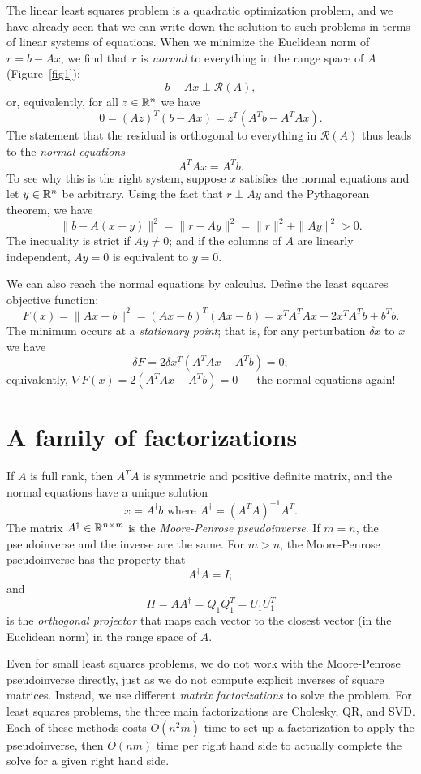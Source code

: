 \documentclass[12pt, leqno]{article} %
\begin{document}
The linear least squares problem is a quadratic optimization problem,
and we have already seen that we can write down the solution to such
problems in terms of linear systems of equations.
When we minimize the Euclidean norm of $r = b-Ax$, we find that $r$ is
{\em normal} to everything in the range space of $A$ (Figure~\ref{fig1}):
\[
  b-Ax \perp \mathcal{R}(A),
\]
or, equivalently, for all $z \in \mathbb{R}^n$ we have
\[
  0 = (Az)^T (b-Ax) = z^T(A^T b - A^T A x).
\]
The statement that the residual is orthogonal to everything in
$\mathcal{R}(A)$ thus leads to the {\em normal equations}
\[
  A^T A x = A^T b.
\]
To see why this is the right system, suppose $x$ satisfies the normal
equations and let $y \in \mathbb{R}^{n}$ be arbitrary.  Using the fact that
$r \perp Ay$ and the Pythagorean theorem, we have
\[
  \|b-A(x+y)\|^2 = \|r-Ay\|^2 = \|r\|^2 + \|Ay\|^2 > 0.
\]
The inequality is strict if $Ay \neq 0$; and if the columns of
$A$ are linearly independent, $Ay = 0$ is equivalent to $y = 0$.

We can also reach the normal equations by calculus.  Define
the least squares objective function:
\[
  F(x) = \|Ax-b\|^2 = (Ax-b)^T (Ax-b) = x^T A^TA x - 2x^T A^T b + b^T b.
\]
The minimum occurs at a {\em stationary point}; that is,
for any perturbation $\delta x$ to $x$ we have
\[
  \delta F = 2 \delta x^T (A^T A x - A^T b) = 0;
\]
equivalently, $\nabla F(x) = 2 (A^T A x - A^T b) = 0$ ---
the normal equations again!

\section{A family of factorizations}

If $A$ is full rank, then $A^T A$ is symmetric and positive definite
matrix, and the normal equations have a unique solution
\[
  x = A^{\dagger} b \mbox{ where } A^{\dagger} = (A^T A)^{-1} A^T.
\]
The matrix $A^\dagger \in \mathbb{R}^{n \times m}$ is the
{\em Moore-Penrose pseudoinverse}.
If $m = n$, the pseudoinverse and the inverse are
the same.  For $m > n$, the Moore-Penrose pseudoinverse
has the property that
\[
  A^\dagger A = I;
\]
and
\[
  \Pi = A A^\dagger = Q_1 Q_1^T = U_1 U_1^T
\]
is the {\em orthogonal projector} that maps each vector to the
closest vector (in the Euclidean norm) in the range space of $A$.

Even for small least squares problems, we do not work with the Moore-Penrose
pseudoinverse directly, just as we do not compute explicit inverses of
square matrices.  Instead, we use different {\em matrix factorizations}
to solve the problem.  For least squares problems, the three main
factorizations are Cholesky, QR, and SVD.  Each of these methods costs
$O(n^2 m)$ time to set up a factorization to apply the pseudoinverse,
then $O(nm)$ time per right hand side to actually complete the solve
for a given right hand side.
\end{document}
